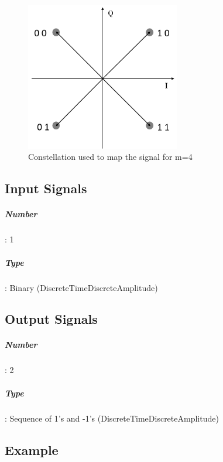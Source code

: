 \begin{figure}
	\centering
	\includegraphics[width=0.6\textwidth]{./lib/m_qam_mapper/figures/MQAM_constellation}
	
	\caption{Constellation used to map the signal for m=4 }\label{constellation}
	
\end{figure}

\subsection*{Input Signals}

\subparagraph*{Number}: 1

\subparagraph*{Type}: Binary (DiscreteTimeDiscreteAmplitude)

\subsection*{Output Signals}

\subparagraph*{Number}: 2

\subparagraph*{Type}: Sequence of 1's and -1's (DiscreteTimeDiscreteAmplitude)

\subsection*{Example}

